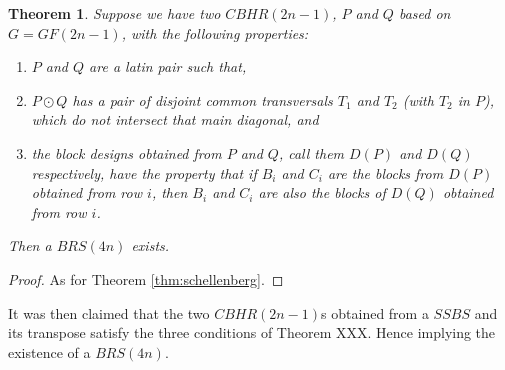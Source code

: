 \documentclass[
  11pt,
  a4paper]{book}\usepackage[]{graphicx}\usepackage[]{xcolor}
\newtheorem{theorem}{Theorem}
\begin{document}
\begin{theorem}
Suppose we have two $CBHR(2n - 1)$, $P$ and $Q$ based on
$G = GF(2n - 1)$, with the following properties:
\begin{enumerate}
  \item{$P$ and $Q$ are a latin pair such that,}
  \item{$P \odot Q$ has a pair of disjoint
    \emph{common transversals} $T_1$ and $T_2$
    (with $T_2$ in $P$), which do not intersect that main
    diagonal, and}
  \item{the block designs obtained from $P$ and $Q$, call
    them $D(P)$ and $D(Q)$ respectively, have the property
    that if $B_i$ and $C_i$ are the blocks from $D(P)$
    obtained from row $i$, then $B_i$ and $C_i$
    are also the blocks of $D(Q)$ obtained from row $i$.}
\end{enumerate}

Then a $BRS(4n)$ exists.
\end{theorem}

\begin{proof}
As for Theorem \ref{thm:schellenberg}.
\end{proof}

It was then claimed that the two $CBHR(2n - 1)$s obtained from
a $SSBS$ and its transpose satisfy the three conditions of
Theorem XXX. Hence implying the existence of a $BRS(4n)$.
\end{document}
